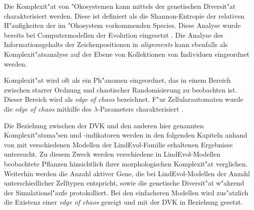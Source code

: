 Die Komplexit"at von "Okosystemen kann mittels der genetischen Diversit"at charakterisiert werden. Diese ist definiert
als die Shannon-Entropie der relativen H"aufigkeiten der im "Okosystem vorkommenden Species. Diese Analyse wurde bereits
bei Computermodellen der Evolution eingesetzt \cite{Ray94}. Die Analyse des Informationsgehalts der Zeichenpositionen
in \textsl{alignments} \cite{Schneider90} kann ebenfalls als Komplexit"atsanalyse auf der Ebene von Kollektionen von Individuen
eingeordnet werden.

Komplexit"at wird oft als ein Ph"anomen eingeordnet, das in einem Bereich zwischen starrer Ordnung und chaotischer Randomisierung
zu beobachten ist. Dieser Bereich wird als \textsl{edge of chaos} bezeichnet. F"ur Zellularautomaten wurde die 
\textsl{edge of chaos} mithilfe des $\lambda$-Parameters charakterisiert \cite{Langton92}.

Die Beziehung zwischen der DVK und den anderen hier genannten Komplexit"atsma"sen und -in\-di\-ka\-to\-ren werden in den folgenden
Kapiteln anhand von mit verschiedenen Modellen der LindEvol-Familie erhaltenen Ergebnisse untersucht. Zu diesem Zweck
werden verschiedene in LindEvol-Modellen beobachtete Pflanzen hinsichtlich ihrer morphologischen Komplexit"at verglichen.
Weiterhin werden die Anzahl aktiver Gene, die bei LindEvol-Modellen der Anzahl unterschiedlicher Zelltypen entspricht,
sowie die genetische Diversit"at w"ahrend der Simulationsl"aufe protokolliert. Bei den einfacheren Modellen wird zus"atzlich
die Existenz einer \textsl{edge of chaos} gezeigt und mit der DVK in Beziehung gesetzt.


